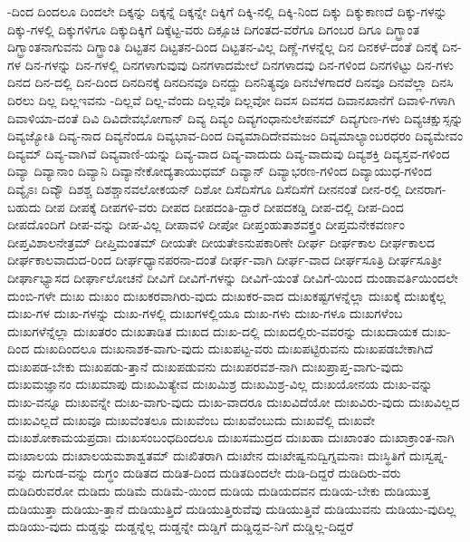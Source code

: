 {-ದಿಂದ
ದಿಂದಲೂ
ದಿಂದಲೇ
ದಿಕ್ಕನ್ನು
ದಿಕ್ಕನ್ನೆ
ದಿಕ್ಕನ್ನೇ
ದಿಕ್ಕಿಗೆ
ದಿಕ್ಕಿ-ನಲ್ಲಿ
ದಿಕ್ಕಿ-ನಿಂದ
ದಿಕ್ಕು
ದಿಕ್ಕುಕಾಣದೆ
ದಿಕ್ಕು-ಗಳನ್ನು
ದಿಕ್ಕು-ಗಳಲ್ಲಿ
ದಿಕ್ಕುಗಳಿಗೂ
ದಿಕ್ಕುದಿಕ್ಕಿಗೆ
ದಿಕ್ಕೆಟ್ಟ-ವರು
ದಿಕ್ಸೂಚಿ
ದಿಗಂತದ-ವರೆಗೂ
ದಿಗಂಬರ
ದಿಗೂ
ದಿಗ್ಭ್ರಾಂತ
ದಿಗ್ಭ್ರಾಂತನಾಗುವನು
ದಿಗ್ಭ್ರಾಂತಿ
ದಿಟ್ಟತನ
ದಿಟ್ಟತನ-ದಿಂದ
ದಿಟ್ಟತನ-ವಿಲ್ಲ
ದಿಣ್ಣೆ-ಗಳನ್ನೆಲ್ಲ
ದಿನ
ದಿನಕಳೆ-ದಂತೆ
ದಿನಕ್ಕೆ
ದಿನ-ಗಳ
ದಿನ-ಗಳನ್ನು
ದಿನ-ಗಳಲ್ಲಿ
ದಿನಗಳಾಗುವುವು
ದಿನಗಳಾದಮೇಲೆ
ದಿನಗಳಾದವು
ದಿನ-ಗಳಿಂದ
ದಿನಗಳಿಟ್ಟು
ದಿನ-ಗಳು
ದಿನದ
ದಿನ-ದಲ್ಲಿ
ದಿನ-ದಿಂದ
ದಿನದಿನಕ್ಕೆ
ದಿನದಿನವೂ
ದಿನದ್ದು
ದಿನನಿತ್ಯವೂ
ದಿನಬೆಳಗಾದರೆ
ದಿನವೂ
ದಿನವೆಲ್ಲಾ
ದಿನಸಿ
ದಿರಲು
ದಿಲ್ಲ
ದಿಲ್ಲಇವನು
-ದಿಲ್ಲವೆ
ದಿಲ್ಲ-ವೆಂದು
ದಿಲ್ಲವೊ
ದಿಲ್ಲವೋ
ದಿವಸ
ದಿವಸದ
ದಿವಾನಖಾನೆಗೆ
ದಿವಾಳಿ-ಗಳಾಗಿ
ದಿವಾಳಿಯಾ-ದಂತೆ
ದಿವಿ
ದಿವಿದೇವಭೋಗಾನ್
ದಿವ್ಯ
ದಿವ್ಯಂ
ದಿವ್ಯಗಂಧಾನುಲೇಪನಮ್
ದಿವ್ಯಗುಣ-ಗಳು
ದಿವ್ಯಚಕ್ಷುಸ್ಸನ್ನು
ದಿವ್ಯಜ್ಯೋತಿ
ದಿವ್ಯ-ನಾದ
ದಿವ್ಯನೆಂದೂ
ದಿವ್ಯಭಾವ-ದಿಂದ
ದಿವ್ಯಮಾದಿದೇವಮಜಂ
ದಿವ್ಯಮಾಲ್ಯಾಂಬರಧರಂ
ದಿವ್ಯಮೇವಂ
ದಿವ್ಯಮ್
ದಿವ್ಯ-ವಾಗಿವೆ
ದಿವ್ಯವಾಣಿ-ಯನ್ನು
ದಿವ್ಯ-ವಾದ
ದಿವ್ಯ-ವಾದುದು
ದಿವ್ಯ-ವಾದುವು
ದಿವ್ಯಶಕ್ತಿ
ದಿವ್ಯಸ್ತವ-ಗಳಿಂದ
ದಿವ್ಯಾ
ದಿವ್ಯಾನಾಂ
ದಿವ್ಯಾನಿ
ದಿವ್ಯಾನೇಕೋದ್ಯತಾಯುಧಮ್
ದಿವ್ಯಾನ್
ದಿವ್ಯಾಭರಣ-ಗಳಿಂದ
ದಿವ್ಯಾಯುಧ-ಗಳಿಂದ
ದಿವ್ಯೈಽಃ
ದಿವ್ಯೌ
ದಿಶಶ್ಚ
ದಿಶಶ್ಚಾನವಲೋಕಯನ್
ದಿಶೋ
ದಿಸೆದಿಸೆಗೂ
ದಿಸೆದಿಸೆಗೆ
ದೀನನಂತೆ
ದೀನ-ರಲ್ಲಿ
ದೀನರಾಗ-ಬಹುದು
ದೀಪ
ದೀಪಕ್ಕೆ
ದೀಪಗಳಿ-ವರು
ದೀಪದ
ದೀಪದಂತಿ-ದ್ದಾರೆ
ದೀಪದಕಡ್ಡಿ
ದೀಪ-ದಲ್ಲಿ
ದೀಪ-ದಿಂದ
ದೀಪದೊಂದಿಗೆ
ದೀಪ-ವನ್ನು
ದೀಪ-ವಿಲ್ಲ
ದೀಪಾವಳಿ
ದೀಪೋ
ದೀಪ್ತಂಹುತಾಶವಕ್ತ್ರಂ
ದೀಪ್ತಮನೇಕವರ್ಣಂ
ದೀಪ್ತವಿಶಾಲನೇತ್ರಮ್
ದೀಪ್ತಿಮಂತಮ್
ದೀಯತೇ
ದೀಯತೇಽನುಪಕಾರಿಣೇ
ದೀರ್ಘ
ದೀರ್ಘಕಾಲ
ದೀರ್ಘಕಾಲದ
ದೀರ್ಘಕಾಲವಾದುದ-ರಿಂದ
ದೀರ್ಘಧ್ಯಾನಪರನಾ-ದಂತೆ
ದೀರ್ಘ-ವಾಗಿ
ದೀರ್ಘ-ವಾದ
ದೀರ್ಘಸೂತ್ರಿ
ದೀರ್ಘಸೂತ್ರೀ
ದೀರ್ಘಾಭ್ಯಾಸದ
ದೀರ್ಘಾಲೋಚನೆ
ದೀವಿಗೆ
ದೀವಿಗೆ-ಗಳನ್ನು
ದೀವಿಗೆ-ಯಂತೆ
ದೀವಿಗೆ-ಯಿಂದ
ದುಂಡಾವರ್ತಿಯಿಂದಲೇ
ದುಂಬಿ-ಗಳೇ
ದುಃಖ
ದುಃಖಂ
ದುಃಖಕರವಾಗಿರು-ವುದು
ದುಃಖಕರ-ವಾದ
ದುಃಖಕಷ್ಟಗಳನ್ನೆಲ್ಲಾ
ದುಃಖಕ್ಕೆ
ದುಃಖಕ್ಕೆಲ್ಲ
ದುಃಖ-ಗಳ
ದುಃಖ-ಗಳನ್ನು
ದುಃಖ-ಗಳಲ್ಲಿ
ದುಃಖಗಳಲ್ಲಿಯೂ
ದುಃಖ-ಗಳು
ದುಃಖ-ಗಳೂ
ದುಃಖಗಳೆಂಬ
ದುಃಖಗಳೆನ್ನೆಲ್ಲಾ
ದುಃಖತರಂ
ದುಃಖತಾಡಿತ
ದುಃಖದ
ದುಃಖ-ದಲ್ಲಿ
ದುಃಖದಲ್ಲಿರು-ವವರನ್ನು
ದುಃಖದಾಯಕ
ದುಃಖ-ದಿಂದ
ದುಃಖದಿಂದಲೂ
ದುಃಖನಾಶಕ-ವಾಗು-ವುದು
ದುಃಖಪಟ್ಟ-ವರು
ದುಃಖಪಟ್ಟಿರುವನು
ದುಃಖಪಡಬೇಕಾಗಿದೆ
ದುಃಖಪಡ-ಬೇಕು
ದುಃಖಪಡು-ತ್ತಾನೆ
ದುಃಖಪಡುವನು
ದುಃಖಪರವಶ-ನಾಗಿ
ದುಃಖಪ್ರಾಪ್ತ-ವಾಗು-ವುದು
ದುಃಖಮಜ್ಞಾನಂ
ದುಃಖಮಾಪು
ದುಃಖಮಿತ್ಯೇವ
ದುಃಖಮಿಶ್ರ
ದುಃಖಮಿಶ್ರ-ವಿಲ್ಲ
ದುಃಖಯೋನಯ
ದುಃಖ-ವನ್ನು
ದುಃಖ-ವನ್ನೂ
ದುಃಖವನ್ನೇ
ದುಃಖ-ವಾಗು-ವುದು
ದುಃಖ-ವಾದರೂ
ದುಃಖವಿದೆಯೋ
ದುಃಖವಿರು-ವುದು
ದುಃಖವಿಲ್ಲದ
ದುಃಖವಿಲ್ಲದೆ
ದುಃಖವೂ
ದುಃಖವೆಂತಲೂ
ದುಃಖವೆಂಬ
ದುಃಖವೆಂಬುದು
ದುಃಖವೆಲ್ಲಿ
ದುಃಖವೇ
ದುಃಖಶೋಕಾಮಯಪ್ರದಾಃ
ದುಃಖಸಂಬಂಧದಿಂದಲೂ
ದುಃಖಸಮುದ್ರದ
ದುಃಖಹಾ
ದುಃಖಾಂತಂ
ದುಃಖಾಕ್ರಾಂತ-ನಾಗಿ
ದುಃಖಾಲಯ
ದುಃಖಾಲಯಮಶಾಶ್ವತಮ್
ದುಃಖಿತರಾಗಿ
ದುಃಖೇನ
ದುಃಖೇಷ್ವನುದ್ವಿಗ್ನಮನಾಃ
ದುಃಸ್ಥಿತಿಗೆ
ದುಃಸ್ವಪ್ನ-ವನ್ನು
ದುಗುಡ-ವನ್ನು
ದುಗ್ಧಂ
ದುಡಿತದ
ದುಡಿತ-ದಿಂದ
ದುಡಿತದಿಂದಲೇ
ದುಡಿ-ದಿದ್ದರೆ
ದುಡಿದಿರು-ವರು
ದುಡಿದಿರುವರೋ
ದುಡಿದು
ದುಡಿಮೆ
ದುಡಿಮೆ-ಯಿಂದ
ದುಡಿಯ
ದುಡಿಯದವನ
ದುಡಿಯ-ಬೇಕು
ದುಡಿಯುತ್ತ
ದುಡಿಯುತ್ತಾ
ದುಡಿಯು-ತ್ತಾನೆ
ದುಡಿಯುತ್ತಿದೆ
ದುಡಿಯುತ್ತಿರುವೆವು
ದುಡಿಯುತ್ತಿವೆ
ದುಡಿಯುವನು
ದುಡಿಯು-ವುದಿಲ್ಲ
ದುಡಿಯು-ವುದು
ದುಡ್ಡನ್ನು
ದುಡ್ಡನ್ನೆಲ್ಲ
ದುಡ್ಡನ್ನೇ
ದುಡ್ಡಿಗೆ
ದುಡ್ಡಿದ್ದವ-ನಿಗೆ
ದುಡ್ಡಿಲ್ಲ-ದಿದ್ದರೆ
}
